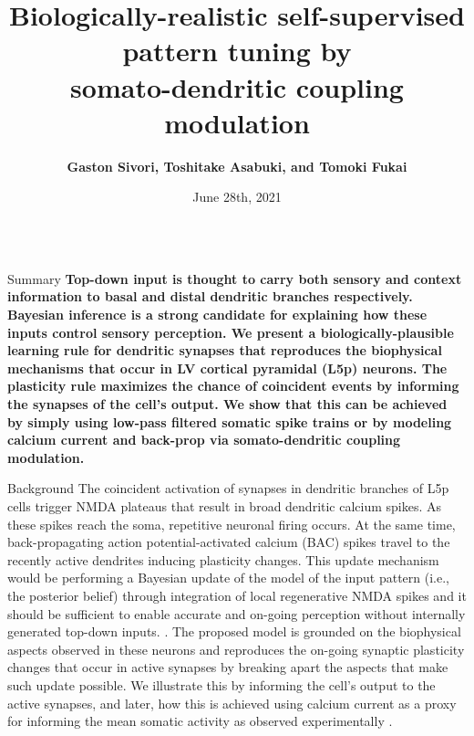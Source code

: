 \documentclass[final]{beamer}
\title{\huge Biologically-realistic self-supervised pattern tuning by \\somato-dendritic coupling modulation}
\author{\textbf{Gaston Sivori, Toshitake Asabuki, and Tomoki Fukai}}
\institute[OIST]{Neural Coding and Brain Computing Unit, OIST Graduate University, Okinawa, Japan}
\date[June 28th, 2021]{June 28th, 2021}
\begin{document}
\begin{frame}
\begin{columns}[t]

\begin{column}{.325\textwidth}

\begin{block}{Summary}
  \justify
  \textbf{Top-down input is thought to carry both sensory and context information to basal and distal dendritic branches respectively. Bayesian inference is a strong candidate for explaining how these inputs control sensory perception. We present a biologically-plausible learning rule for dendritic synapses that reproduces the biophysical mechanisms that occur in LV cortical pyramidal (L5p) neurons. The plasticity rule maximizes the chance of coincident events by informing the synapses of the cell's output. We show that this can be achieved by simply using low-pass filtered somatic spike trains or by modeling calcium current and back-prop via somato-dendritic coupling modulation.}
\end{block}

\begin{block}{Background}
  \justify
 The coincident activation of synapses in dendritic branches of L5p cells trigger NMDA plateaus that result in broad dendritic calcium spikes. As these spikes reach the soma, repetitive neuronal firing occurs. At the same time, back-propagating action potential-activated calcium (BAC) spikes travel to the recently active dendrites inducing plasticity changes. This update mechanism would be performing a Bayesian update of the model of the input pattern (i.e., the posterior belief) through integration of local regenerative NMDA spikes \cite{larkum2009} and it should be sufficient to enable accurate and on-going perception without internally generated top-down inputs. \cite{manita2017}. The proposed model is grounded on the biophysical aspects observed in these neurons and reproduces the on-going synaptic plasticity changes that occur in active synapses by breaking apart the aspects that make such update possible. We illustrate this by informing the cell's output to the active synapses, and later, how this is achieved using calcium current as a proxy for informing the mean somatic activity as observed experimentally \cite{krieger2017}.
\end{block}


\end{column}
\end{columns}
\end{frame}
\end{document}
